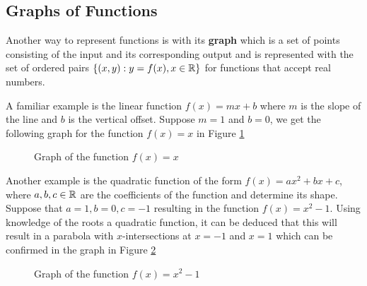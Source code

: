\subsection{Graphs of Functions}

Another way to represent functions is with its \textbf{graph} which is a set of points consisting of the input and its corresponding output and is represented with the set of ordered pairs $\{(x,y) : y = f(x), x\in\mathbb{R}\}$ for functions that accept real numbers.

\begin{example}
    A familiar example is the linear function $f(x) = mx + b$ where $m$ is the slope of the line and $b$ is the vertical offset. Suppose $m = 1$ and $b = 0$, we get the following graph for the function $f(x) = x$ in Figure \ref{f(x)=x graph}
    \begin{figure}[!ht]
        \centering
        \label{f(x)=x graph}
        \caption{Graph of the function $f(x) = x$}
    \end{figure}
\end{example}

\begin{example}
    Another example is the quadratic function of the form $f(x) = ax^2 + bx + c$, where $a,b,c \in \mathbb{R}$ are the coefficients of the function and determine its shape. Suppose that $a = 1, b = 0, c = -1$ resulting in the function $f(x) = x^2 - 1$. Using knowledge of the roots a quadratic function, it can be deduced that this will result in a parabola with $x$-intersections at $x = -1$ and $x = 1$ which can be confirmed in the graph in Figure \ref{f(x)=x^2-1graph}

    \begin{figure}[!ht]
        \centering
        \label{f(x)=x^2-1graph}
        \caption{Graph of the function $f(x) = x^2-1$}
    \end{figure}
\end{example}

